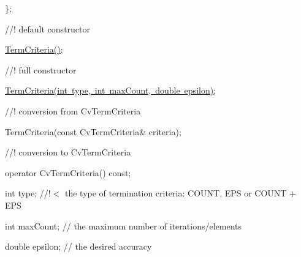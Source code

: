{\ttfamily }

{\ttfamily }

{\ttfamily \};}

{\ttfamily }

{\ttfamily }

{\ttfamily //! default constructor}

{\ttfamily }

{\ttfamily }

{\ttfamily \mbox{\hyperlink{classorg_1_1opencv_1_1core_1_1_term_criteria_abba54a5a885a351eb8dd7faea5a5220c}{Term\+Criteria()}};}

{\ttfamily }

{\ttfamily }

{\ttfamily //! full constructor}

{\ttfamily }

{\ttfamily }

{\ttfamily \mbox{\hyperlink{classorg_1_1opencv_1_1core_1_1_term_criteria_aab618b09e5c0396892be99f3723c1280}{Term\+Criteria(int type, int max\+Count, double epsilon)}};}

{\ttfamily }

{\ttfamily }

{\ttfamily //! conversion from Cv\+Term\+Criteria}

{\ttfamily }

{\ttfamily }

{\ttfamily Term\+Criteria(const Cv\+Term\+Criteria\& criteria);}

{\ttfamily }

{\ttfamily }

{\ttfamily //! conversion to Cv\+Term\+Criteria}

{\ttfamily }

{\ttfamily }

{\ttfamily operator Cv\+Term\+Criteria() const;}

{\ttfamily }

{\ttfamily }

{\ttfamily int type; //!$<$ the type of termination criteria\+: C\+O\+U\+NT, E\+PS or C\+O\+U\+NT + E\+PS}

{\ttfamily }

{\ttfamily }

{\ttfamily int max\+Count; // the maximum number of iterations/elements}

{\ttfamily }

{\ttfamily }

{\ttfamily double epsilon; // the desired accuracy}

